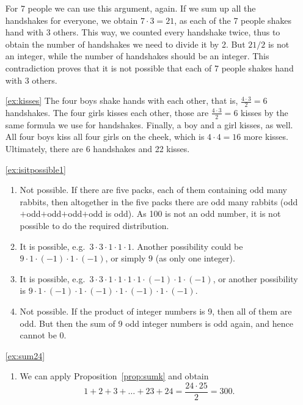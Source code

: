 \begin{enumerate}
For 7 people we can use this argument, again. 
If we sum up all the handshakes for everyone, we obtain $7 \cdot 3 = 21$, 
as each of the 7 people shakes hand with 3 others. 
This way, we counted every handshake twice, 
thus to obtain the number of handshakes we need to divide it by 2. 
But $21/2$ is not an integer, 
while the number of handshakes should be an integer. 
This contradiction proves that it is not possible that each of 7 people shakes hand with 3 others. 

\item[\ref{ex:kisses}]
The four boys shake hands with each other, 
that is, $\frac{4 \cdot 3}{2} = 6$ handshakes. 
The four girls kisses each other, 
those are $\frac{4 \cdot 3}{2} = 6$ kisses by the same formula we use for handshakes. 
Finally, a boy and a girl kisses, as well. 
All four boys kiss all four girls on the cheek, 
which is $4 \cdot 4 = 16$ more kisses. 
Ultimately, there are 6 handshakes and 22 kisses. 

\item[\ref{ex:isitpossible1}]
\begin{enumerate}
\item
Not possible. 
If there are five packs, each of them containing odd many rabbits, 
then altogether in the five packs there are odd many rabbits 
(odd$+$odd$+$odd$+$odd$+$odd is odd). 
As 100 is not an odd number, 
it is not possible to do the required distribution. 

\item%
It is possible, 
e.g.\ $3 \cdot 3 \cdot 1 \cdot 1\cdot 1$. 
Another possibility could be $9 \cdot 1 \cdot (-1) \cdot 1 \cdot (-1)$, 
or simply $9$ (as only one integer).

\item%
It is possible, 
e.g.\  $3 \cdot 3 \cdot 1 \cdot 1\cdot 1\cdot 1 \cdot (-1) \cdot 1 \cdot (-1)$, 
or another possibility is $9 \cdot 1 \cdot (-1) \cdot 1 \cdot (-1) \cdot 1 \cdot (-1) \cdot 1 \cdot (-1)$. 

\item%
Not possible. 
If the product of integer numbers is 9, then all of them are odd. 
But then the sum of 9 odd integer numbers is odd again, 
and hence cannot be 0. 
\end{enumerate}

\item[\ref{ex:sum24}]
\begin{enumerate}
\item
We can apply Proposition~\ref{prop:sumk} and obtain
\[
1 + 2 + 3 + \dots + 23 + 24 = \frac{24\cdot 25}{2} = 300. 
\]


\end{enumerate}
\end{enumerate}
